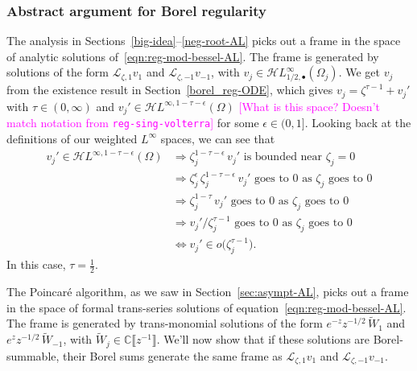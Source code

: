 \documentclass{article}
\newcommand{\singexp}[2]{\mathcal{H}L^\infty_{#1, #2}}
\newcommand{\singexpalg}[1]{\singexp{#1}{\bullet}}
\newcommand{\holoL}[1]{\mathcal{H}L^{#1}} %
\newcommand{\C}{\mathbb{C}}
\newcommand{\laplace}{\mathcal{L}}
\theoremstyle{definition}
\theoremstyle{plain}
\newenvironment{verify}{\color{ForestGreen}}{\color{black}}
\begin{document}
{\subsubsection{Abstract argument for Borel regularity}\label{bessel-regularity-AL}
The analysis in Sections~\ref{big-idea}--\ref{neg-root-AL} picks out a frame in the space of analytic solutions of~\eqref{eqn:reg-mod-bessel-AL}. The frame is generated by solutions of the form $\laplace_{\zeta, 1} v_1$ and $\laplace_{\zeta, -1} v_{-1}$, with $v_j\in\singexpalg{1/2}(\Omega_j)$.
\begin{verify}
We get $v_j$ from the existence result in Section~\ref{borel_reg-ODE}, which gives $v_j = \zeta^{\tau-1} + v_j'$ with $\tau \in (0, \infty)$ and $v_j' \in \holoL{\infty, 1-\tau-\epsilon}(\Omega)$ \textcolor{magenta}{[What is this space? Doesn't match notation from {\tt reg-sing-volterra}]} for some $\epsilon \in (0, 1]$. Looking back at the definitions of our weighted $L^\infty$ spaces, we can see that
\begin{align*}
v_j' \in \holoL{\infty, 1-\tau-\epsilon}(\Omega) & \Longrightarrow \zeta_j^{1-\tau-\epsilon}\,v_j' \text{ is bounded near } \zeta_j = 0 \\
& \Longrightarrow \zeta_j^\epsilon\,\zeta_j^{1-\tau-\epsilon}\,v_j' \text{ goes to } 0 \text{ as } \zeta_j \text{ goes to } 0 \\
& \Longrightarrow \zeta_j^{1-\tau}\,v_j' \text{ goes to } 0 \text{ as } \zeta_j \text{ goes to } 0 \\
& \Longrightarrow v_j' / \zeta_j^{\tau-1} \text{ goes to } 0 \text{ as } \zeta_j \text{ goes to } 0 \\
& \Longleftrightarrow v_j' \in o\big(\zeta_j^{\tau-1}\big).
\end{align*}
In this case, $\tau = \tfrac{1}{2}$.
\end{verify}

The Poincar\'{e} algorithm, as we saw in Section~\ref{sec:asympt-AL}, picks out a frame in the space of formal trans-series solutions of equation~\eqref{eqn:reg-mod-bessel-AL}. The frame is generated by trans-monomial solutions of the form $e^{-z} z^{-1/2}\,\tilde{W}_1$ and $e^z z^{-1/2}\,\tilde{W}_{-1}$, with $\tilde{W}_j \in \C\llbracket z^{-1} \rrbracket$. We'll now show that if these solutions are Borel-summable, their Borel sums generate the same frame as $\laplace_{\zeta, 1} v_1$ and $\laplace_{\zeta, -1} v_{-1}$.

}
\end{document}
